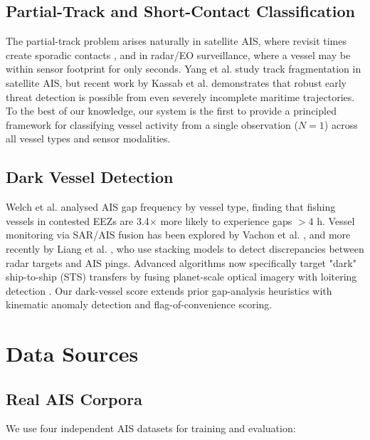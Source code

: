 \documentclass[journal]{IEEEtran}
\begin{document}
\subsection{Partial-Track and Short-Contact Classification}

The partial-track problem arises naturally in satellite AIS, where revisit
times create sporadic contacts \cite{yang2019identification}, and in
radar/EO surveillance, where a vessel may be within sensor footprint for
only seconds.
%
Yang et al. \cite{yang2019identification} study track fragmentation in
satellite AIS, but recent work by Kassab et al. \cite{kassab2024early}
demonstrates that robust early threat detection is possible from even
severely incomplete maritime trajectories.
%
To the best of our knowledge, our system is the first to provide a
principled framework for classifying vessel activity from a single
observation ($N=1$) across all vessel types and sensor modalities.

\subsection{Dark Vessel Detection}

Welch et al. \cite{welch2021dark} analysed AIS gap frequency by vessel type,
finding that fishing vessels in contested EEZs are 3.4$\times$ more likely
to experience gaps $>4$ h.
%
Vessel monitoring via SAR/AIS fusion has been explored by Vachon et al.
\cite{vachon2015ship}, and more recently by Liang et al. \cite{liang2025iuu},
who use stacking models to detect discrepancies between radar targets and
AIS pings.
%
Advanced algorithms now specifically target "dark" ship-to-ship (STS)
transfers by fusing planet-scale optical imagery with loitering detection
\cite{ballinger2024automatic}.
%
Our dark-vessel score extends prior gap-analysis heuristics with kinematic
anomaly detection and flag-of-convenience scoring.

\section{Data Sources}
\label{sec:data}

\subsection{Real AIS Corpora}

We use four independent AIS datasets for training and evaluation:
\end{document}

